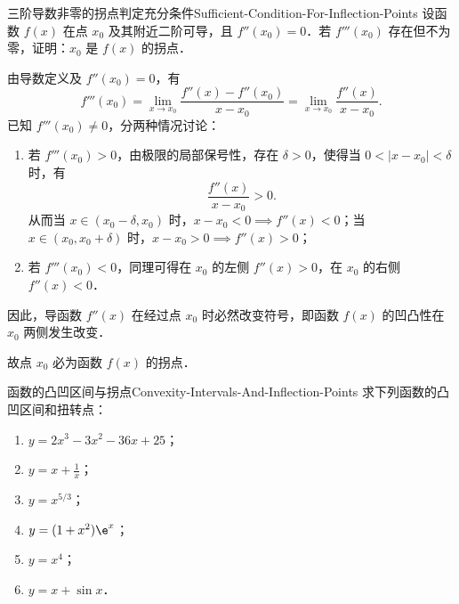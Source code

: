 \begin{problem}{三阶导数非零的拐点判定充分条件}{Sufficient-Condition-For-Inflection-Points}
    设函数 $f(x)$ 在点 $x_0$ 及其附近二阶可导，且 $f''(x_0) = 0$．若 $f'''(x_0)$ 存在但不为零，证明：$x_0$ 是 $f(x)$ 的拐点．
\end{problem}

\begin{myproof}
    由导数定义及 $f''(x_0) = 0$，有
    \begin{equation}
        f'''(x_0) = \lim_{x\to x_0} \frac{f''(x) - f''(x_0)}{x - x_0} = \lim_{x\to x_0} \frac{f''(x)}{x - x_0}.
    \end{equation}
    已知 $f'''(x_0) \neq 0$，分两种情况讨论：
    \begin{enumerate}
        \item 若 $f'''(x_0) > 0$，由极限的局部保号性，存在 $\delta > 0$，使得当 $0 < |x - x_0| < \delta$ 时，有
              \begin{equation}
                  \frac{f''(x)}{x - x_0} > 0.
              \end{equation}
              从而当 $x \in (x_0 - \delta, x_0)$ 时，$x - x_0 < 0 \implies f''(x) < 0$；当 $x \in (x_0, x_0 + \delta)$ 时，$x - x_0 > 0 \implies f''(x) > 0$；
        \item 若 $f'''(x_0) < 0$，同理可得在 $x_0$ 的左侧 $f''(x) > 0$，在 $x_0$ 的右侧 $f''(x) < 0$．
    \end{enumerate}
    因此，导函数 $f''(x)$ 在经过点 $x_0$ 时必然改变符号，即函数 $f(x)$ 的凹凸性在 $x_0$ 两侧发生改变．

    故点 $x_0$ 必为函数 $f(x)$ 的拐点．
\end{myproof}

\begin{problem}{函数的凸凹区间与拐点}{Convexity-Intervals-And-Inflection-Points}
    求下列函数的凸凹区间和扭转点：
    \begin{enumerate}
        \item $y = 2x^3 - 3x^2 - 36x + 25$；
        \item $y = x + \frac{1}{x}$；
        \item $y = x^{5/3}$；
        \item $y = (1 + x^2)\e^x$；
        \item $y = x^4$；
        \item $y = x + \sin x$．
    \end{enumerate}
\end{problem}

